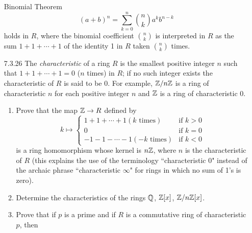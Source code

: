 \begin{enumerate}
                  Binomial Theorem
                  $$(a + b)^n = \sum_{k=0}^n\binom{n}{k}a^kb^{n-k}$$
                  holds in $R$, where the binomial coefficient $\binom{n}{k}$ is
                  interpreted in $R$ as the sum $1 + 1 + \cdots + 1$ of the
                  identity 1 in $R$ taken $\binom{n}{k}$ times.
   \item[7.3.26]  The \textit{characteristic} of a ring $R$ is the smallest
                  positive integer $n$ such that $1 + 1 + \cdots + 1 = 0$
                  ($n$ times) in $R$; if no such integer exists the 
                  characteristic of $R$ is said to be 0. For example,
                  $\mathbb{Z}/n\mathbb{Z}$ is a ring of characteristic $n$ for each positive 
                  integer $n$ and $\mathbb{Z}$ is a ring of characteristic 0.
                  \begin{enumerate}
                     \item Prove that the map $\mathbb{Z} \rightarrow R$ defined by
                           \begin{equation*}
                              k \mapsto \left\{
                                 \begin{array}{ll}
                                    1 + 1 + \cdots + 1 (k \text{ times}) &
                                       \text{if } k > 0 \\
                                    0 & \text{if } k = 0 \\
                                    -1 - 1 - \cdots - 1 (-k \text{ times}) &
                                       \text{if } k < 0
                                 \end{array} \right.
                           \end{equation*}
                           is a ring homomorphism whose kernel is $n\mathbb{Z}$, where
                           $n$ is the characteristic of $R$ (this explains the
                           use of the terminology ``characteristic 0" instead of
                           the archaic phrase ``characteristic $\infty$" for
                           rings in which no sum of 1's is zero).
                     \item Determine the characteristics of the rings $\mathbb{Q}$,
                           $\mathbb{Z}[x]$, $\mathbb{Z}/n\mathbb{Z}[x]$.
                     \item Prove that if $p$ is a prime and if $R$ is a
                           commutative ring of characteristic $p$, then

\end{enumerate}
\end{enumerate}
